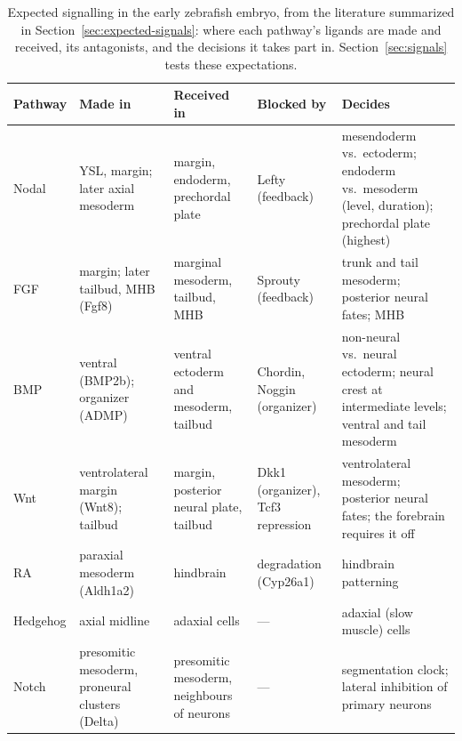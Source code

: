 \documentclass[11pt,a4paper]{article}
\begin{document}
\begin{table}[htbp]
	\centering
	\footnotesize
	\setlength{\tabcolsep}{3pt}
	\renewcommand{\arraystretch}{1.15}
	\begin{tabular}{@{}>{\raggedright\arraybackslash}p{1.4cm}>{\raggedright\arraybackslash}p{3.1cm}>{\raggedright\arraybackslash}p{3.0cm}>{\raggedright\arraybackslash}p{2.6cm}>{\raggedright\arraybackslash}p{5.6cm}@{}}
		\toprule
		Pathway & Made in & Received in & Blocked by & Decides \\
		\midrule
		Nodal & YSL, margin; later axial mesoderm & margin, endoderm, prechordal plate & Lefty (feedback) & mesendoderm vs.\ ectoderm; endoderm vs.\ mesoderm (level, duration); prechordal plate (highest) \\
		FGF & margin; later tailbud, MHB (Fgf8) & marginal mesoderm, tailbud, MHB & Sprouty (feedback) & trunk and tail mesoderm; posterior neural fates; MHB \\
		BMP & ventral (BMP2b); organizer (ADMP) & ventral ectoderm and mesoderm, tailbud & Chordin, Noggin (organizer) & non-neural vs.\ neural ectoderm; neural crest at intermediate levels; ventral and tail mesoderm \\
		Wnt & ventrolateral margin (Wnt8); tailbud & margin, posterior neural plate, tailbud & Dkk1 (organizer), Tcf3 repression & ventrolateral mesoderm; posterior neural fates; the forebrain requires it off \\
		RA & paraxial mesoderm (Aldh1a2) & hindbrain & degradation (Cyp26a1) & hindbrain patterning \\
		Hedgehog & axial midline & adaxial cells & --- & adaxial (slow muscle) cells \\
		Notch & presomitic mesoderm, proneural clusters (Delta) & presomitic mesoderm, neighbours of neurons & --- & segmentation clock; lateral inhibition of primary neurons \\
		\bottomrule
	\end{tabular}
	\caption{Expected signalling in the early zebrafish embryo, from the literature summarized in Section~\ref{sec:expected-signals}: where each pathway's ligands are made and received, its antagonists, and the decisions it takes part in. Section~\ref{sec:signals} tests these expectations.}
	\label{tab:expected-signals}
\end{table}
\end{document}
